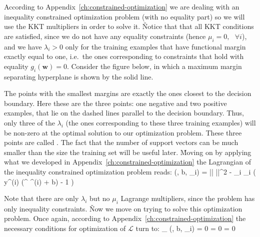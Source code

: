 According to Appendix~\ref{ch:constrained-optimization} we are dealing with an inequality constrained optimization
problem (with no equality part) so we will use the KKT multipliers in order to solve it. \v

Notice that that all KKT conditions are satisfied, since we do not have any equality constraints (hence $\mu_{i} = 0,
\:\:\: \forall i$), and we have $\lambda_{i} > 0$ only for the training examples that have functional margin exactly
equal to one, i.e.\ the ones corresponding to constraints that hold with equality $ g_{i}(\boldsymbol{w}) = 0$.
Consider the figure below, in which a maximum margin separating hyperplane is shown by the solid line.


\vspace{-10pt}

The points with the smallest margins are exactly the ones closest to the decision boundary. Here these are the three
points: one negative and two positive examples, that lie on the dashed lines parallel to the decision boundary. Thus,
only three of the $\lambda_{i}$ (the ones corresponding to these three training examples) will be non-zero at the
optimal solution to our optimization problem. These three points are called . The fact that the
number of support vectors can be much smaller than the size the training set will be useful later. \v

Moving on by applying what we developed in Appendix~\ref{ch:constrained-optimization} the Lagrangian of the
inequality constrained optimization problem reads:
\bse
{}(, b, \lambda_{i}) =  ||  ||^2 - \sum_{i} \lambda_{i} \left( y^{(i)}
(^{\intercal} ^{(i)} + b) - 1 \right)
\ese

Note that there are only $\lambda_{i}$ but no $\mu_{i}$ Lagrange multipliers, since the problem has only inequality
constraints. \v

Now we move on trying to solve this optimization problem. Once again, according to
Appendix~\ref{ch:constrained-optimization} the necessary conditions for optimization of $ \mathcal{L}$ turn to:
\bse
\nabla_{} (, b, \lambda_{i}) = 0 \:\:\:  \:\:\:
 = 0 \:\:\:  \:\:\:
 = 0
\ese

